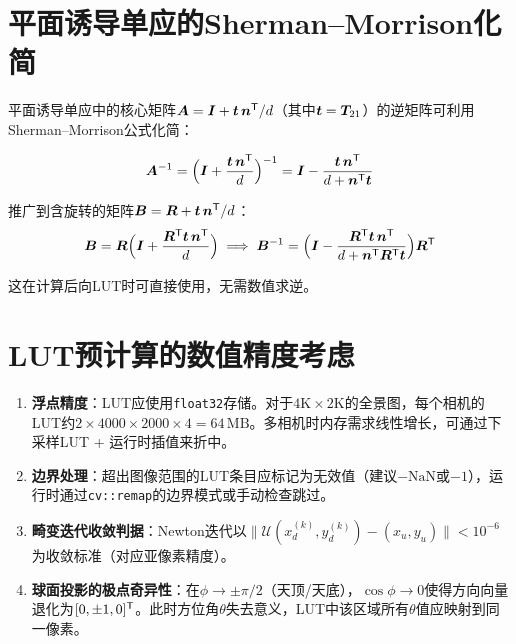 \section{平面诱导单应的Sherman--Morrison化简}
\label{apx:sherman-morrison}

平面诱导单应中的核心矩阵$\bm{A} = \bm{I} + \bm{t}\,\bm{n}^{\mathsf{T}}/d$（其中$\bm{t} = \bm{T}_{21}$）的逆矩阵可利用Sherman--Morrison公式化简：

\begin{equation}
\bm{A}^{-1} = \Bigl(\bm{I} + \frac{\bm{t}\,\bm{n}^{\mathsf{T}}}{d}\Bigr)^{-1}
            = \bm{I} - \frac{\bm{t}\,\bm{n}^{\mathsf{T}}}{d + \bm{n}^{\mathsf{T}}\bm{t}}
\label{eq:sherman}
\end{equation}

推广到含旋转的矩阵$\bm{B} = \bm{R} + \bm{t}\,\bm{n}^{\mathsf{T}}/d$：
\begin{equation}
\bm{B} = \bm{R}\Bigl(\bm{I} + \frac{\bm{R}^{\mathsf{T}}\bm{t}\,\bm{n}^{\mathsf{T}}}{d}\Bigr)
        \;\Longrightarrow\;
\bm{B}^{-1} = \Bigl(\bm{I} - \frac{\bm{R}^{\mathsf{T}}\bm{t}\,\bm{n}^{\mathsf{T}}}{d + \bm{n}^{\mathsf{T}}\bm{R}^{\mathsf{T}}\bm{t}}\Bigr)\bm{R}^{\mathsf{T}}
\label{eq:sherman-rt}
\end{equation}

这在计算后向LUT时可直接使用，无需数值求逆。

\section{LUT预计算的数值精度考虑}
\label{apx:precision}

\begin{enumerate}[leftmargin=*]
  \item \textbf{浮点精度}：LUT应使用\texttt{float32}存储。对于$4\text{K}\times 2\text{K}$的全景图，每个相机的LUT约$2 \times 4000 \times 2000 \times 4 = 64\,\text{MB}$。多相机时内存需求线性增长，可通过下采样LUT + 运行时插值来折中。
  \item \textbf{边界处理}：超出图像范围的LUT条目应标记为无效值（建议$-\text{NaN}$或$-1$），运行时通过\texttt{cv::remap}的边界模式或手动检查跳过。
  \item \textbf{畸变迭代收敛判据}：Newton迭代以$\|\mathcal{U}(x_d^{(k)}, y_d^{(k)}) - (x_u, y_u)\| < 10^{-6}$为收敛标准（对应亚像素精度）。
  \item \textbf{球面投影的极点奇异性}：在$\phi \to \pm\pi/2$（天顶/天底），$\cos\phi \to 0$使得方向向量退化为$[0, \pm 1, 0]^{\mathsf{T}}$。此时方位角$\theta$失去意义，LUT中该区域所有$\theta$值应映射到同一像素。
\end{enumerate}


